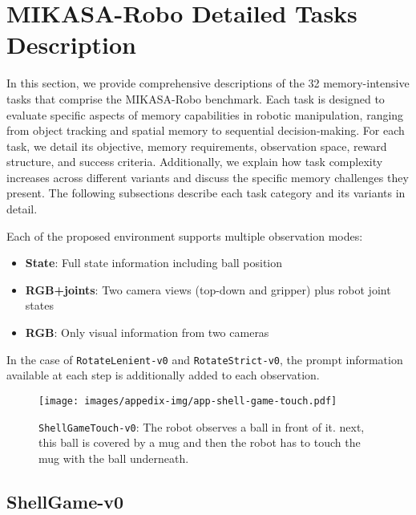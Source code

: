 \newpage

\section{MIKASA-Robo Detailed Tasks Description}
\label{app:tasks-description}

In this section, we provide comprehensive descriptions of the 32 memory-intensive tasks that comprise the MIKASA-Robo benchmark. Each task is designed to evaluate specific aspects of memory capabilities in robotic manipulation, ranging from object tracking and spatial memory to sequential decision-making. For each task, we detail its objective, memory requirements, observation space, reward structure, and success criteria. Additionally, we explain how task complexity increases across different variants and discuss the specific memory challenges they present. The following subsections describe each task category and its variants in detail.

Each of the proposed environment supports multiple observation modes:
\begin{itemize}
    \item \textbf{State}: Full state information including ball position
    \item \textbf{RGB+joints}: Two camera views (top-down and gripper) plus robot joint states
    \item \textbf{RGB}: Only visual information from two cameras
\end{itemize}

In the case of \texttt{RotateLenient-v0} and \texttt{RotateStrict-v0}, the prompt information available at each step is additionally added to each observation.

\newpage
\begin{figure*}[h!]
    \centering
    \texttt{[image: images/appedix-img/app-shell-game-touch.pdf]}
    \vspace{-15pt}
    \caption{\texttt{ShellGameTouch-v0}: The robot observes a ball in front of it. next, this ball is covered by a mug and then the robot has to touch the mug with the ball underneath.}
    \label{fig:app-shell-game-touch}
    \vspace{-15pt}
\end{figure*}
\subsection{ShellGame-v0}
\label{app:shell-game}

